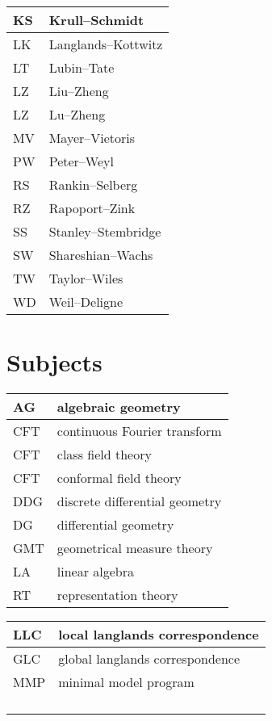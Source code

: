 \documentclass{amsart}
\numberwithin{equation}{section}
\theoremstyle{plain}
\numberwithin{equation}{section}
\theoremstyle{remark}
\begin{document}
\begin{longtable}{l|l}
KS & Krull--Schmidt\\ \hline
LK & Langlands--Kottwitz\\ \hline
LT  & Lubin--Tate\\ \hline
LZ & Liu--Zheng\\ \hline
LZ & Lu--Zheng\\ \hline
MV & Mayer--Vietoris\\ \hline
PW  & Peter--Weyl\\ \hline
RS & Rankin--Selberg\\ \hline
RZ & Rapoport--Zink\\ \hline
SS & Stanley--Stembridge\\ \hline
SW & Shareshian--Wachs\\ \hline
TW & Taylor--Wiles\\ \hline
WD & Weil--Deligne\\ \hline
\end{longtable}

\section{Subjects}

\begin{longtable}{l|l}
\hline
AG & algebraic geometry \\ \hline
CFT  & continuous Fourier transform\\ \hline
CFT & class field theory\\ \hline
CFT & conformal field theory\\ \hline
DDG & discrete differential geometry\\ \hline
DG & differential geometry\\ \hline
GMT  & geometrical measure theory\\ \hline
LA & linear algebra  \\ \hline
RT & representation theory\\ \hline
\end{longtable}

\begin{longtable}{l|l}
\hline
LLC & local langlands correspondence \\ \hline
GLC & global langlands correspondence  \\ \hline
MMP & minimal model program\\ \hline
 & \\ \hline
 & \\ \hline
 & \\ \hline
 & \\ \hline
\end{longtable}
\end{document}
